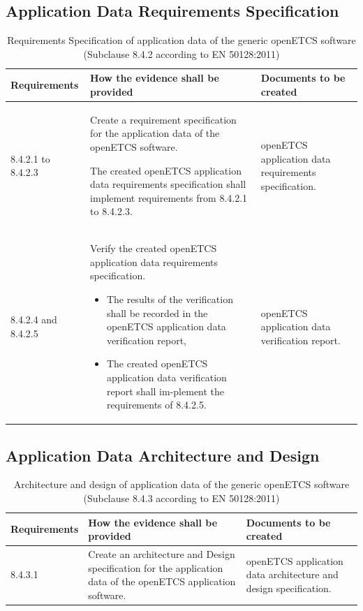 \documentclass{template/openetcs_report}
\begin{document}
\subsection{Application Data Requirements Specification}
{\footnotesize\sffamily\centering
\begin{longtable}{|p{2cm}|p{9cm}|p{3cm}|}
\caption{Requirements Specification of application data of the generic openETCS software (Subclause 8.4.2 according to EN 50128:2011)}\\
\hline
\bfseries Requirements & \bfseries How the evidence shall be provided & \bfseries Documents to be created\\
\hline
\hline
\endhead
\hline
\endfoot

8.4.2.1 to 8.4.2.3 & Create a requirement specification for the  application data of the openETCS software.

The created openETCS application data requirements specification shall implement requirements from 8.4.2.1 to 8.4.2.3.
& openETCS application data requirements specification.\\ 
\hline
8.4.2.4 and 8.4.2.5 & Verify the created openETCS application data requirements specification.
\begin{itemize}\itemsep=0pt
  \item The results of the verification shall be recorded in the openETCS application data verification report,
  \item The created openETCS application data verification report shall im-plement the requirements of 8.4.2.5. 
\end{itemize}
& openETCS application data verification report.\\ 
\hline
\end{longtable}}


\subsection{Application Data Architecture and Design}
{\footnotesize\sffamily\centering
\begin{longtable}{|p{2cm}|p{9cm}|p{3cm}|}
\caption{Architecture and design of application data of the generic openETCS software (Subclause 8.4.3 according to EN 50128:2011)}\\
\hline
\bfseries Requirements & \bfseries How the evidence shall be provided & \bfseries Documents to be created\\
\hline
\hline
\endhead
\hline
\endfoot

8.4.3.1  & Create an architecture and Design specification for the application data of the openETCS application software.
& openETCS application data architecture and design specification.\\ 
\hline
\end{longtable}}
\end{document}
